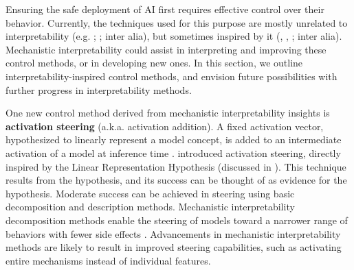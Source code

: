 Ensuring the safe deployment of AI first requires effective control over their behavior. Currently, the techniques used for this purpose are mostly unrelated to interpretability (e.g. \citet{christiano2023deepreinforcementlearninghuman}; \citet{rafailov2024directpreferenceoptimizationlanguage}; inter alia), but sometimes inspired by it (\citet{panickssery2024steeringllama2contrastive}, \citet{zou2024improvingalignmentrobustnesscircuit}, \citet{kirch2024featurespromptsjailbreakllms}; inter alia). Mechanistic interpretability could assist in interpreting  \citep{lee2024mechanisticunderstandingalignmentalgorithms} and improving \citep{conmy2024activation} these control methods, or in developing new ones. In this section, we outline interpretability-inspired control methods, and envision future possibilities with further progress in interpretability methods.


One new control method derived from mechanistic interpretability insights is \textbf{activation steering} (a.k.a. activation addition). A fixed activation vector, hypothesized to linearly represent a model concept, is added to an intermediate activation of a model at inference time \citep{2024inferencetimeinterventionelicitingtruthful, turner2024steeringlanguagemodelsactivation,zou2023representationengineeringtopdownapproach,panickssery2024steeringllama2contrastive}. \citet{turner2024steeringlanguagemodelsactivation} introduced activation steering, directly inspired by the Linear Representation Hypothesis (discussed in ). This technique results from the hypothesis, and its success can be thought of as evidence for the hypothesis. Moderate success can be achieved in steering using basic decomposition and description methods. Mechanistic interpretability decomposition methods enable the steering of models toward a narrower range of behaviors with fewer side effects \citep{chalnev2024improvingsteeringvectorstargeting}. Advancements in mechanistic interpretability methods are likely to result in improved steering capabilities, such as activating entire mechanisms instead of individual features.

